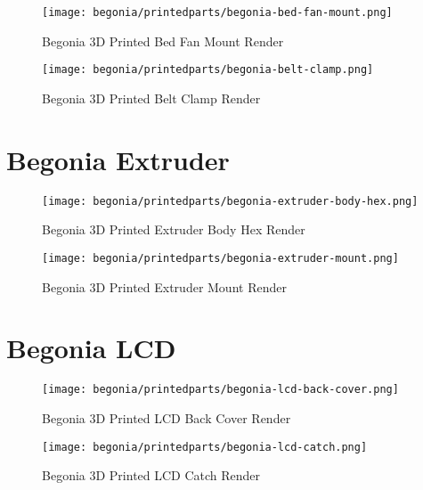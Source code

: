\begin{figure}[H]
\centering
\texttt{[image: begonia/printedparts/begonia-bed-fan-mount.png]}
\caption{Begonia 3D Printed Bed Fan Mount Render}
\label{fig:begbedfanmountrender}
\end{figure}

\begin{figure}[H]
\centering
\texttt{[image: begonia/printedparts/begonia-belt-clamp.png]}
\caption{Begonia 3D Printed Belt Clamp Render}
\label{fig:begbeltclamp}
\end{figure}



\section{Begonia Extruder}

\begin{figure}[H]
\centering
\texttt{[image: begonia/printedparts/begonia-extruder-body-hex.png]}
\caption{Begonia 3D Printed Extruder Body Hex Render}
\label{fig:begextruderbodyhex}
\end{figure}

\begin{figure}[H]
\centering
\texttt{[image: begonia/printedparts/begonia-extruder-mount.png]}
\caption{Begonia 3D Printed Extruder Mount Render}
\label{fig:begextrudermount}
\end{figure}

\section{Begonia LCD}

\begin{figure}[H]
\centering
\texttt{[image: begonia/printedparts/begonia-lcd-back-cover.png]}
\caption{Begonia 3D Printed LCD Back Cover Render}
\label{fig:beglcdbackcover}
\end{figure}

\begin{figure}[H]
\centering
\texttt{[image: begonia/printedparts/begonia-lcd-catch.png]}
\caption{Begonia 3D Printed LCD Catch Render}
\label{fig:beglcdcatch}
\end{figure}

